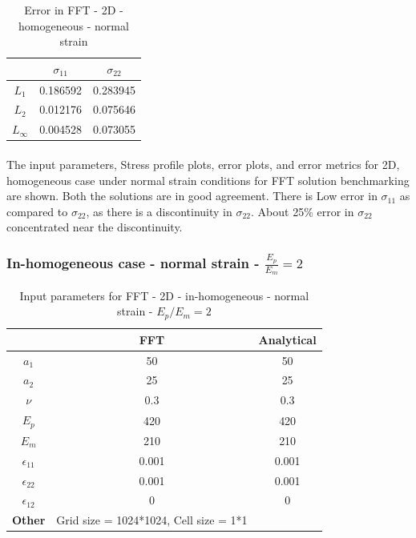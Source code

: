 \documentclass[12pt, a4paper]{report}
\begin{document}
\begin{table}[H]
    \centering
    \begin{tabular}{|c|c|c|}
        \hline
        &\textbf{$\sigma_{11}$} &  \textbf{$\sigma_{22}$} \\
        \hline
        $L_1$ & 0.186592 & 0.283945 \\
        \hline
        $L_2$ & 0.012176 & 0.075646  \\
        \hline 
        $L_\infty$ & 0.004528 & 0.073055 \\
        \hline
    \end{tabular}
    \caption{Error in FFT - 2D - homogeneous - normal strain}
\end{table}

\paragraph{}
The input parameters, Stress profile plots, error plots, and error metrics for 2D, homogeneous case under normal strain conditions for FFT solution benchmarking are shown. Both the solutions are in good agreement. There is Low error in $\sigma_{11}$ as compared to $\sigma_{22}$, as there is a discontinuity in $\sigma_{22}$. About 25\% error in $\sigma_{22}$ concentrated near the discontinuity.


\newpage
\subsubsection{In-homogeneous case - normal strain - $\frac{E_p}{E_m} = 2$}
\begin{table}[H]
    \centering
    \begin{tabular}{|c|c|c|}
        \hline
        & \textbf{FFT} &\textbf{Analytical}\\
        \hline
        \textbf{$a_1$} & 50 & 50 \\
        \hline
        \textbf{$a_2$} & 25 & 25 \\
        \hline
        \textbf{$\nu$} & 0.3 & 0.3 \\
        \hline
        \textbf{$E_p$} & 420 & 420 \\
        \hline
        \textbf{$E_m$} & 210 & 210 \\
        \hline
        \textbf{$\epsilon_{11}$} & 0.001 & 0.001 \\
        \hline
        \textbf{$\epsilon_{22}$} & 0.001 & 0.001 \\
        \hline
        \textbf{$\epsilon_{12}$} & 0 & 0 \\
        \hline
        \textbf{Other} & Grid size = 1024*1024, Cell size = 1*1 &  \\
        \hline
    \end{tabular}
    \caption{Input parameters for FFT - 2D - in-homogeneous - normal strain - $E_p / E_m = 2$}
\end{table}
\end{document}
